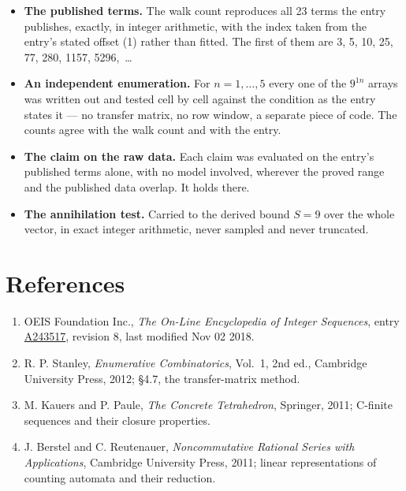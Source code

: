 \documentclass[11pt]{article}
\theoremstyle{definition}
\begin{document}
\begin{itemize}

\item {\bfseries The published terms.} The walk count reproduces all 23 terms the entry publishes, exactly, in integer arithmetic, with the index taken from the entry's stated offset (1) rather than fitted. The first of them are 3, 5, 10, 25, 77, 280, 1157, 5296,~\dots

\item {\bfseries An independent enumeration.} For $n = 1,\dots,5$ every one of the $9^{1n}$ arrays was written out and tested cell by cell against the condition as the entry states it --- no transfer matrix, no row window, a separate piece of code. The counts agree with the walk count and with the entry.

\item {\bfseries The claim on the raw data.} Each claim was evaluated on the entry's published terms alone, with no model involved, wherever the proved range and the published data overlap. It holds there.

\item {\bfseries The annihilation test.} Carried to the derived bound $S = 9$ over the whole vector, in exact integer arithmetic, never sampled and never truncated.

\end{itemize}

\section{References}

\begin{enumerate}

\item OEIS Foundation Inc., \emph{The On-Line Encyclopedia of Integer Sequences}, entry \href{https://oeis.org/A243517}{A243517}, revision 8, last modified Nov 02 2018.

\item R. P. Stanley, \emph{Enumerative Combinatorics}, Vol.~1, 2nd ed., Cambridge University Press, 2012; \S4.7, the transfer-matrix method.

\item M. Kauers and P. Paule, \emph{The Concrete Tetrahedron}, Springer, 2011; C-finite sequences and their closure properties.

\item J. Berstel and C. Reutenauer, \emph{Noncommutative Rational Series with Applications}, Cambridge University Press, 2011; linear representations of counting automata and their reduction.

\end{enumerate}
\end{document}
